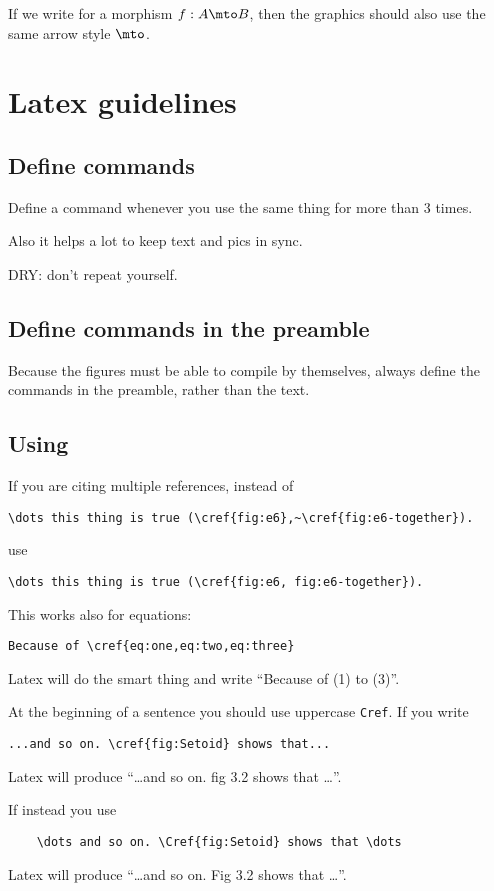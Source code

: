If we write for a morphism $f: A \mto B$, then the graphics should also use the same arrow style $\mto$.

\section{Latex guidelines}

\subsection*{Define commands }

Define a command whenever you use the same thing for more than 3 times.

Also it helps a lot to keep text and pics in sync.

DRY: don't repeat yourself.

\subsection{Define commands in the preamble }

Because the figures must be able to compile by themselves, always define the commands in the preamble, rather than the text.

\subsection{Using }

If you are citing multiple references, instead of
%
\begin{verbatim}
\dots this thing is true (\cref{fig:e6},~\cref{fig:e6-together}).
\end{verbatim}
%
use
%
\begin{verbatim}
\dots this thing is true (\cref{fig:e6, fig:e6-together}).
\end{verbatim}
%
This works also for equations:
%
\begin{verbatim}
Because of \cref{eq:one,eq:two,eq:three}
\end{verbatim}
%
Latex will do the smart thing and write ``Because of (1) to (3)''.

At the beginning of a sentence you should use uppercase \texttt{Cref}.
If you write
%
\begin{verbatim}
...and so on. \cref{fig:Setoid} shows that...
\end{verbatim}
%
Latex will produce ``\dots and so on.
fig 3.2 shows that \dots''.

If instead you use
\begin{verbatim}
    \dots and so on. \Cref{fig:Setoid} shows that \dots
\end{verbatim}
Latex will produce ``\dots and so on.
Fig 3.2 shows that \dots''.

